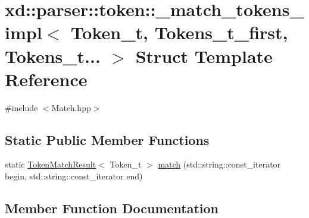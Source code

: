 \hypertarget{structxd_1_1parser_1_1token_1_1__match__tokens__impl_3_01_token__t_00_01_tokens__t__first_00_01_tokens__t_8_8_8_01_4}{}\section{xd\+:\+:parser\+:\+:token\+:\+:\+\_\+match\+\_\+tokens\+\_\+impl$<$ Token\+\_\+t, Tokens\+\_\+t\+\_\+first, Tokens\+\_\+t... $>$ Struct Template Reference}
\label{structxd_1_1parser_1_1token_1_1__match__tokens__impl_3_01_token__t_00_01_tokens__t__first_00_01_tokens__t_8_8_8_01_4}


{\ttfamily \#include $<$Match.\+hpp$>$}

\subsection*{Static Public Member Functions}
\begin{DoxyCompactItemize}
\item 
static \mbox{\hyperlink{namespacexd_1_1parser_1_1token_a766c52bbfb7cb1f08498ef0bb9ec756e}{Token\+Match\+Result}}$<$ Token\+\_\+t $>$ \mbox{\hyperlink{structxd_1_1parser_1_1token_1_1__match__tokens__impl_3_01_token__t_00_01_tokens__t__first_00_01_tokens__t_8_8_8_01_4_ae4346fd4c191ee9dfd429c6badbca2bf}{match}} (std\+::string\+::const\+\_\+iterator begin, std\+::string\+::const\+\_\+iterator end)
\end{DoxyCompactItemize}


\subsection{Member Function Documentation}
\mbox{\label{structxd_1_1parser_1_1token_1_1__match__tokens__impl_3_01_token__t_00_01_tokens__t__first_00_01_tokens__t_8_8_8_01_4_ae4346fd4c191ee9dfd429c6badbca2bf}} 
